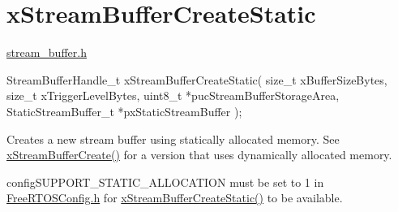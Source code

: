 \hypertarget{group__x_stream_buffer_create_static}{}\section{x\+Stream\+Buffer\+Create\+Static}
\label{group__x_stream_buffer_create_static}
\mbox{\hyperlink{stream__buffer_8h}{stream\+\_\+buffer.\+h}}


\begin{DoxyPre}
StreamBufferHandle\_t xStreamBufferCreateStatic( size\_t xBufferSizeBytes,
                                                size\_t xTriggerLevelBytes,
                                                uint8\_t *pucStreamBufferStorageArea,
                                                StaticStreamBuffer\_t *pxStaticStreamBuffer );
\end{DoxyPre}
 Creates a new stream buffer using statically allocated memory. See \mbox{\hyperlink{stream__buffer_8h_a39aa4dd8b83e2df7ded291f863fb5fed}{x\+Stream\+Buffer\+Create()}} for a version that uses dynamically allocated memory.

config\+S\+U\+P\+P\+O\+R\+T\+\_\+\+S\+T\+A\+T\+I\+C\+\_\+\+A\+L\+L\+O\+C\+A\+T\+I\+ON must be set to 1 in \mbox{\hyperlink{_free_r_t_o_s_config_8h}{Free\+R\+T\+O\+S\+Config.\+h}} for \mbox{\hyperlink{stream__buffer_8h_a3c248575ac1b83801db605b32a118f77}{x\+Stream\+Buffer\+Create\+Static()}} to be available.


